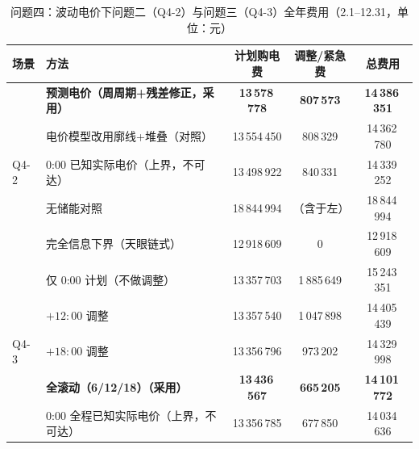 \begin{table}[htbp]
\centering
\caption{问题四\nobreak：波动电价下问题二（Q4-2\nobreak）与问题三（Q4-3\nobreak）全年费用（2.1--12.31\nobreak，单位\nobreak：元\nobreak）}
\label{tab:q4cmp}
\begin{tabular}{@{}llccc@{}}
\toprule
场景 & 方法 & 计划购电费 & 调整/紧急费 & 总费用 \\
\midrule
\multirow{5}{*}{Q4-2}
& \textbf{预测电价（周周期+残差修正\nobreak，采用\nobreak）} & \textbf{13\,578\,778} & \textbf{807\,573} & \textbf{14\,386\,351} \\
& 电价模型改用廓线+堆叠（对照\nobreak） & 13\,554\,450 & 808\,329 & 14\,362\,780 \\
& 0:00 已知实际电价（上界\nobreak，不可达\nobreak） & 13\,498\,922 & 840\,331 & 14\,339\,252 \\
& 无储能对照 & 18\,844\,994 & （含于左\nobreak） & 18\,844\,994 \\
& 完全信息下界（天眼链式\nobreak） & 12\,918\,609 & 0 & 12\,918\,609 \\
\midrule
\multirow{5}{*}{Q4-3}
& 仅 0:00 计划（不做调整\nobreak） & 13\,357\,703 & 1\,885\,649 & 15\,243\,351 \\
& $+12{:}00$ 调整 & 13\,357\,540 & 1\,047\,898 & 14\,405\,439 \\
& $+18{:}00$ 调整 & 13\,356\,796 & 973\,202 & 14\,329\,998 \\
& \textbf{全滚动（6/12/18\nobreak）（采用\nobreak）} & \textbf{13\,436\,567} & \textbf{665\,205} & \textbf{14\,101\,772} \\
& 0:00 全程已知实际电价（上界\nobreak，不可达\nobreak） & 13\,356\,785 & 677\,850 & 14\,034\,636 \\
\bottomrule
\end{tabular}
\end{table}

